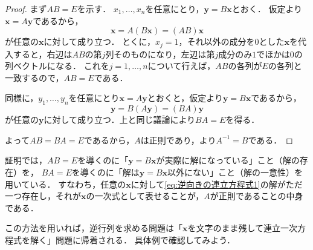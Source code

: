 \begin{tleftbar}
\begin{proof}
  まず$AB = E$を示す．
  $x_1, \dots, x_n$を任意にとり，$\bm{y} = B\bm{x}$とおく．
  仮定より$\bm{x} = A\bm{y}$であるから，
  \[
    \bm{x} = A(B\bm{x}) = (AB)\bm{x}
  \]
  が任意の$\bm{x}$に対して成り立つ．
  とくに，$x_j = 1$，それ以外の成分を$0$とした$\bm{x}$を代入すると，右辺は$AB$の第$j$列そのものになり，左辺は第$j$成分のみ$1$でほかは$0$の列ベクトルになる．
  これを$j = 1, \dots, n$について行えば，$AB$の各列が$E$の各列と一致するので，$AB = E$である．

  同様に，$y_1, \dots, y_n$を任意にとり$\bm{x} = A\bm{y}$とおくと，仮定より$\bm{y} = B\bm{x}$であるから，
  \[
    \bm{y} = B(A\bm{y}) = (BA)\bm{y}
  \]
  が任意の$\bm{y}$に対して成り立つ．上と同じ議論により$BA = E$を得る．

  よって$AB = BA = E$であるから，$A$は正則であり，より$A^{-1} = B$である．
\end{proof}
\end{tleftbar}

証明では，$AB = E$を導くのに「$\bm{y} = B\bm{x}$が実際に解になっている」こと（解の存在）を，
$BA = E$を導くのに「解は$\bm{y} = B\bm{x}$以外にない」こと（解の一意性）を用いている．
すなわち，任意の$\bm{x}$に対して\eqref{eq:逆向きの連立方程式1}の解がただ一つ存在し，それが$\bm{x}$の一次式として表せることが，$A$が正則であることの中身である．

この方法を用いれば，逆行列を求める問題は「$\bm{x}$を文字のまま残して連立一次方程式を解く」問題に帰着される．
具体例で確認してみよう．

